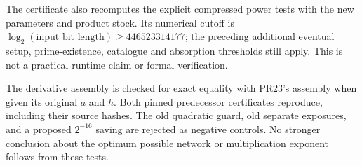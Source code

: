 The certificate also recomputes the explicit compressed power tests with
the new parameters and product stock. Its numerical cutoff is
$\log_2(\text{input bit length})\ge446523314177$; the preceding additional
eventual setup, prime-existence, catalogue and absorption thresholds still
apply. This is not a practical runtime claim or formal verification.

The derivative assembly is checked for exact equality with PR23's assembly
when given its original $a$ and $h$. Both pinned predecessor certificates
reproduce, including their source hashes. The old quadratic guard, old
separate exposures, and a proposed $2^{-16}$ saving are rejected as
negative controls. No stronger conclusion about the optimum possible
network or multiplication exponent follows from these tests.
